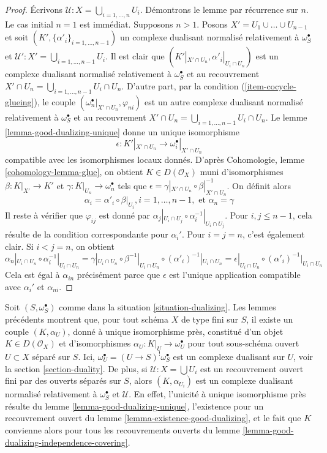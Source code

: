 \begin{proof}
Écrivons $\mathcal{U} : X = \bigcup_{i = 1, \ldots, n} U_i$. Démontrons le lemme par récurrence sur $n$. Le cas initial $n = 1$ est immédiat. Supposons $n > 1$. Posons $X' = U_1 \cup \ldots \cup U_{n - 1}$ et soit $(K', \{\alpha'_i\}_{i = 1, \ldots, n - 1})$ un complexe dualisant normalisé relativement à $\omega_S^\bullet$ et $\mathcal{U}' : X' = \bigcup_{i = 1, \ldots, n - 1} U_i$. Il est clair que $(K'|_{X' \cap U_n}, \alpha'_i|_{U_i \cap U_n})$ est un complexe dualisant normalisé relativement à $\omega_S^\bullet$ et au recouvrement $X' \cap U_n = \bigcup_{i = 1, \ldots, n - 1} U_i \cap U_n$. D'autre part, par la condition (\ref{item-cocycle-glueing}), le couple
$(\omega_n^\bullet|_{X' \cap U_n}, \varphi_{ni})$
est un autre complexe dualisant normalisé relativement à $\omega_S^\bullet$ et au recouvrement $X' \cap U_n = \bigcup_{i = 1, \ldots, n - 1} U_i \cap U_n$. Le lemme \ref{lemma-good-dualizing-unique} donne un unique isomorphisme
$$
\epsilon : K'|_{X' \cap U_n} \longrightarrow \omega_i^\bullet|_{X' \cap U_n}
$$
compatible avec les isomorphismes locaux donnés. D'après Cohomologie, lemme \ref{cohomology-lemma-glue}, on obtient $K \in D(\mathcal{O}_X)$ muni d'isomorphismes $\beta : K|_{X'} \to K'$ et $\gamma : K|_{U_n} \to \omega_n^\bullet$ tels que $\epsilon = \gamma|_{X'\cap U_n} \circ \beta|_{X' \cap U_n}^{-1}$. On définit alors
$$
\alpha_i = \alpha'_i \circ \beta|_{U_i}, i = 1, \ldots, n - 1,
\text{ et }
\alpha_n = \gamma
$$
Il reste à vérifier que $\varphi_{ij}$ est donné par $\alpha_j|_{U_i \cap U_j} \circ \alpha_i^{-1}|_{U_i \cap U_j}$. Pour $i, j \leq n - 1$, cela résulte de la condition correspondante pour $\alpha_i'$. Pour $i = j = n$, c'est également clair. Si $i < j = n$, on obtient
$$
\alpha_n|_{U_i \cap U_n} \circ \alpha_i^{-1}|_{U_i \cap U_n} =
\gamma|_{U_i \cap U_n} \circ \beta^{-1}|_{U_i \cap U_n}
\circ (\alpha'_i)^{-1}|_{U_i \cap U_n} =
\epsilon|_{U_i \cap U_n} \circ (\alpha'_i)^{-1}|_{U_i \cap U_n}
$$
Cela est égal à $\alpha_{in}$ précisément parce que $\epsilon$ est l'unique application compatible avec $\alpha_i'$ et $\alpha_{ni}$.
\end{proof}

\noindent
Soit $(S, \omega_S^\bullet)$ comme dans la situation \ref{situation-dualizing}. Les lemmes précédents montrent que, pour tout schéma $X$ de type fini sur $S$, il existe un couple $(K, \alpha_U)$, donné à unique isomorphisme près, constitué d'un objet $K \in D(\mathcal{O}_X)$ et d'isomorphismes $\alpha_U : K|_U \to \omega_U^\bullet$ pour tout sous-schéma ouvert $U \subset X$ séparé sur $S$. Ici, $\omega_U^\bullet = (U \to S)^!\omega_S^\bullet$ est un complexe dualisant sur $U$, voir la section \ref{section-duality}. De plus, si $\mathcal{U} : X = \bigcup U_i$ est un recouvrement ouvert fini par des ouverts séparés sur $S$, alors $(K, \alpha_{U_i})$ est un complexe dualisant normalisé relativement à $\omega_S^\bullet$ et $\mathcal{U}$. En effet, l'unicité à unique isomorphisme près résulte du lemme \ref{lemma-good-dualizing-unique}, l'existence pour un recouvrement ouvert du lemme \ref{lemma-existence-good-dualizing}, et le fait que $K$ convienne alors pour tous les recouvrements ouverts du lemme \ref{lemma-good-dualizing-independence-covering}.

